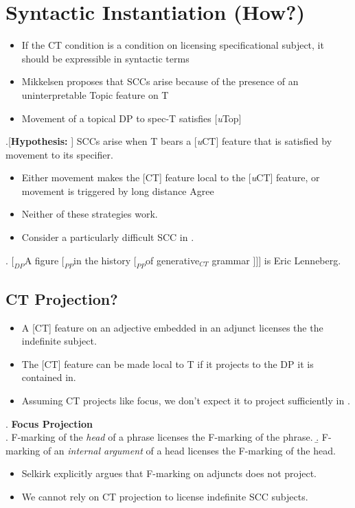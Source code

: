 \documentclass[letterpaper]{article}
\begin{document}
\section{Syntactic Instantiation (How?)}
\begin{itemize}
  \item If the CT condition is a condition on licensing specificational subject, it should be expressible in syntactic terms
  \item Mikkelsen proposes that SCCs arise because of the presence of an uninterpretable Topic feature on T
  \item Movement of a topical DP to spec-T satisfies [\textit{u}Top]
\end{itemize}
\ex.[\textbf{Hypothesis: }] SCCs arise when T bears a [\textit{u}CT] feature that is satisfied by movement to its specifier. 

\begin{itemize}
  \item Either movement makes the [CT] feature local to the [\textit{u}CT] feature, or movement is triggered by long distance Agree
  \item Neither of these strategies work.
  \item Consider a particularly difficult SCC in \Next.
\end{itemize}
\ex. $[_{DP}$A figure $[_{PP}$in the history $[_{PP}$of generative$_{CT}$ grammar $]]]$ is Eric Lenneberg.

\subsection{CT Projection?}
\begin{itemize}
  \item A [CT] feature on an adjective embedded in an adjunct licenses the the indefinite subject.
  \item The [CT] feature can be made local to T if it projects to the DP it is contained in.
  \item Assuming CT projects like focus, we don't expect it to project sufficiently in \Last.
\end{itemize}
\ex. \textbf{Focus Projection} \parencite{selkirk1996sentence}\\
\a. F-marking of the \textit{head} of a phrase licenses the F-marking of the phrase.
\b. F-marking of an \textit{internal argument} of a head licenses the F-marking of the head.

\begin{itemize}
  \item Selkirk explicitly argues that F-marking on adjuncts does not project.
  \item We cannot rely on CT projection to license indefinite SCC subjects.
\end{itemize}
\end{document}
